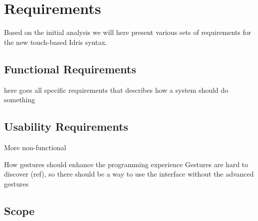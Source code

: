 \section{Requirements}
\label{sec:Requirements}
Based on the initial analysis we will here present various sets of requirements for the new touch-based Idris syntax.

\subsection{Functional Requirements}
\label{subsec:FunctionalRequirements}
here goes all specific requirements that describes how a system should do something

\subsection{Usability Requirements}
More non-functional

How gestures should enhance the programming experience
Gestures are hard to discover (ref), so there should be a way to use the interface without the advanced gestures

\subsection{Scope}
